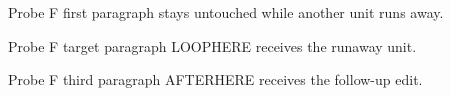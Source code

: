 Probe F first paragraph stays untouched while another unit runs away.

Probe F target paragraph LOOPHERE receives the runaway unit.

Probe F third paragraph AFTERHERE receives the follow-up edit.
